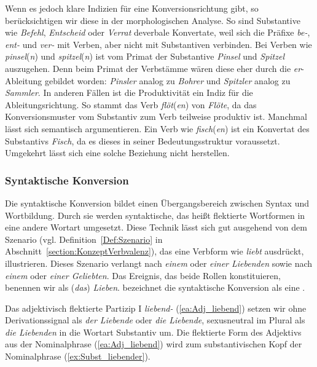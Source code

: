Wenn es jedoch klare Indizien für eine Konversionsrichtung gibt, so berücksichtigen wir diese in der morphologischen Analyse. So sind Substantive wie \textit{Befehl}, \textit{Entscheid} oder \textit{Verrat} deverbale Konvertate, weil sich die Präfixe \textit{be-}, \textit{ent-} und \textit{ver-} mit Verben, aber nicht mit Substantiven verbinden. Bei Verben wie \textit{pinsel}(\textit{n}) und \textit{spitzel}(\textit{n}) ist vom Primat der Substantive \textit{Pinsel} und \textit{Spitzel} auszugehen. Denn beim Primat der Verbstämme wären diese eher durch die \textit{er}-Ableitung gebildet worden: \textit{Pinsler} analog zu \textit{Bohrer} und \textit{Spitzler} analog zu \textit{Sammler}. In anderen Fällen ist die Produktivität ein Indiz für die Ableitungsrichtung. So stammt das Verb \textit{flöt}(\textit{en}) von \textit{Flöte}, da das Konversionsmuster vom Substantiv zum Verb teilweise produktiv ist. Manchmal lässt sich semantisch argumentieren. Ein Verb wie \textit{fisch}(\textit{en}) ist ein Konvertat des Substantivs \textit{Fisch}, da es dieses in seiner Bedeutungsstruktur  voraussetzt. Umgekehrt lässt sich eine solche Beziehung nicht herstellen. 


\subsubsection{Syntaktische Konversion}\label{subsubsection:SyntKonv}

Die syntaktische Konversion bildet einen Übergangsbereich zwischen Syntax und Wortbildung. Durch sie werden syntaktische, das heißt flektierte Wortformen in eine andere Wortart umgesetzt. 
Diese Technik lässt sich gut ausgehend von dem Szenario (vgl. Definition~\ref{Def:Szenario} in Abschnitt~\ref{section:KonzeptVerbvalenz}), das eine Verbform wie \textit{liebt} ausdrückt, illustrieren. Dieses Szenario verlangt nach \textit{einem} oder \textit{einer Liebenden} sowie nach \textit{einem} oder \textit{einer Geliebten}. Das Ereignis, das beide Rollen konstituieren, benennen wir als (\textit{das}) \textit{Lieben}. \citet[22]{Eichinger2000} bezeichnet die syntaktische Konversion als eine .

Das adjektivisch flektierte Partizip I \textit{liebend-} (\ref{ea:Adj_liebend}) setzen wir ohne Derivationssignal als \textit{der Liebende} oder \textit{die Liebende}, sexusneutral im Plural als \textit{die Liebenden} in die Wortart Substantiv um. Die flektierte Form des Adjektivs aus der Nominalphrase (\ref{ea:Adj_liebend}) wird zum substantivischen Kopf der Nominalphrase (\ref{ex:Subst_liebender}).

